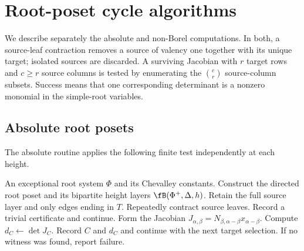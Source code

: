 \section{Root-poset cycle algorithms}
\label{app:root-poset-cycles}

We describe separately the absolute and non-Borel computations.  In both, a
source-leaf contraction removes a source of valency one together with its
unique target; isolated sources are discarded.  A surviving Jacobian with $r$
target rows and $c\ge r$ source columns is tested by enumerating the
$\binom cr$ source-column subsets.  Success means that one corresponding
determinant is a nonzero monomial in the simple-root variables.

\subsection{Absolute root posets}

The absolute routine applies the following finite test independently at each
height.

\begin{tcolorbox}
\begin{algorithmic}[1]
\Require An exceptional root system $\Phi$ and its Chevalley constants.
\State Construct the directed root poset and its bipartite height layers
$\fB(\Phi^+,\Delta,h)$.
  \State Retain the full source layer and only edges ending in $T$.
  \State Repeatedly contract source leaves.
    \State Record a trivial certificate and continue.
  \EndIf
  \State Form the Jacobian
  $J_{\alpha,\beta}=N_{\beta,\alpha-\beta}x_{\alpha-\beta}$.
    \State Compute $d_C\gets\det J_C$.
      \State Record $C$ and $d_C$ and continue with the next target selection.
    \EndIf
  \EndFor
  \State If no witness was found, report failure.
\EndFor
\end{algorithmic}
\end{tcolorbox}
\renewcommand{\figurename}{Algorithm}
\label{alg:absolute-cycles}

